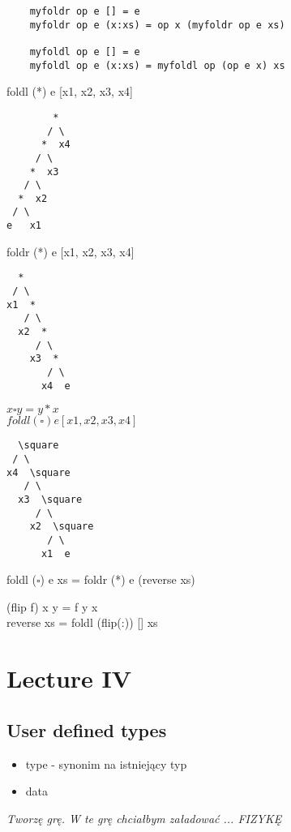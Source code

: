 \documentclass{article}
\begin{document}
\begin{verbatim}
    myfoldr op e [] = e
    myfoldr op e (x:xs) = op x (myfoldr op e xs)
    
    myfoldl op e [] = e 
    myfoldl op e (x:xs) = myfoldl op (op e x) xs
\end{verbatim}

foldl (*) e [x1, x2, x3, x4]
\begin{verbatim}
        *
       / \
      *  x4
     / \
    *  x3
   / \
  *  x2
 / \
e   x1
\end{verbatim}
foldr (*) e [x1, x2, x3, x4]
\begin{verbatim}
  *
 / \
x1  *
   / \
  x2  *
     / \
    x3  *
       / \
      x4  e

\end{verbatim}
$x \square y = y * x$ \\
$foldl (\square) e [x1, x2, x3, x4]$
\begin{verbatim}
  \square
 / \
x4  \square
   / \
  x3  \square
     / \
    x2  \square
       / \
      x1  e
\end{verbatim}

\noindent
foldl ($\square$) e xs = foldr (*) e (reverse xs)

\noindent
(flip f) x y = f y x \\
reverse xs = foldl (flip(:)) [] xs

\section{Lecture IV}

\subsection{User defined types}

\begin{itemize}
    \item type - synonim na istniejący typ
    \item data
\end{itemize}

\textit{Tworzę grę. W te grę chciałbym załadować ... FIZYKĘ}
\end{document}
